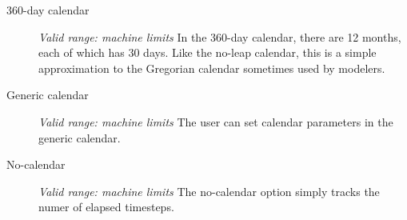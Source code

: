\begin{description}
\item[360-day calendar]
{\it Valid range: machine limits} \newline
In the 360-day calendar, there are 12 months, each of which has 30 days.  
Like the no-leap calendar, this is a simple approximation to the Gregorian
calendar sometimes used by modelers.

\item[Generic calendar]
{\it Valid range: machine limits} \newline 
The user can set calendar parameters in the generic calendar.

\item[No-calendar]
{\it Valid range: machine limits} \newline 
The no-calendar option simply tracks the numer of elapsed timesteps.

\end{description}



